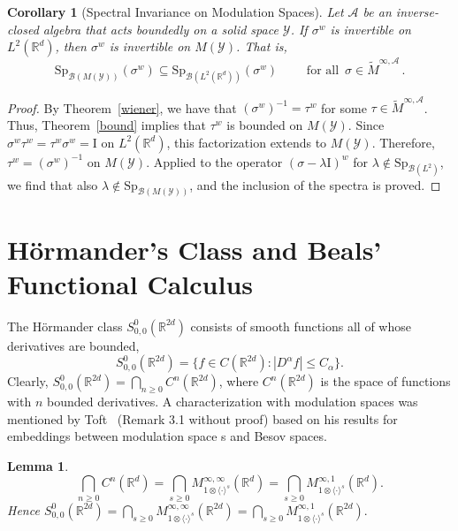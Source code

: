 \documentclass[12pt]{amsart}
\newtheorem{lemma}{Lemma}[section]
\newtheorem{corollary}{Corollary}[section]
\theoremstyle{definition}
\theoremstyle{remark}
\numberwithin{equation}{section}
\newcommand{\modsp}{modulation space}
\newcommand{\rem}{\noindent\textsl{REMARK:}}
\def\cB{\mathcal{B}}
\def\cY{\mathcal{Y}}
\def\bR{{\mathbb{R}}}
\def\weyl{\sigma^w}
\def\rd{\bR^d}
\def\rdd{{\bR^{2d}}}
\def\lrd{L^2(\rd)}
\def\inv{^{-1}}
\def\cB{\mathcal{B}}
\newcommand{\Cal}{\mathcal}
\newcommand{\lan}{\langle}
\newcommand{\ran}{\rangle}
\newcommand{\ac}{\Cal A}
\newcommand{\moda}{\widetilde M^{\infty,\ac}}
\begin{document}
\begin{corollary}
[Spectral Invariance on Modulation Spaces] Let $\ac$ be an
inverse-closed algebra that acts boundedly on a solid space $\cY$.
If $\sigma ^w$ is invertible  on $\lrd $, then $\sigma ^w$ is
invertible on $M(\cY)$. That is,
\begin{equation}
  \label{eq:hh1}
   \mathrm{Sp}_{\cB(M(\cY))} (\weyl) \subseteq  \mathrm{Sp}_{\cB (\lrd)}
 (\weyl) \qquad \text{ for all } \, \sigma \in \moda \, .
\end{equation}
\end{corollary}

\begin{proof}
By Theorem~\ref{wiener}, we have that $(\weyl )\inv = \tau ^w$ for
some $\tau \in \moda$. Thus, Theorem~\ref{bound} implies 
that $\tau ^w$ is bounded on $M(\cY)$. Since $\weyl \tau ^w = \tau
^w
\weyl = \mathrm{I}$ on $\lrd$, this factorization extends to
$M(\cY)$. Therefore, $\tau ^w = (\weyl )\inv $ on $M(\cY)$.
Applied to the
operator $(\sigma -\lambda \mathrm{I})^w$ for $\lambda \not \in
\textrm{Sp}_{\cB (L^2)}$, we find that also $\lambda \not \in
\textrm{Sp}_{\cB (M(\cY))}$, and the inclusion of the spectra is
proved.
\end{proof}





\section{H\"ormander's Class and Beals' Functional Calculus}

The H\"ormander class $S_{0,0}^0(\rdd)$ consists of smooth
functions all of whose  derivatives are bounded,
\[
S_{0,0}^0(\rdd)=\{f\in C(\rdd):|D^\alpha f|\le C_{\alpha}\}.
\]
Clearly,  $S_{0,0}^0(\rdd)=\bigcap_{n\ge0}C^n(\rdd)$,
where $C^n(\rdd)$ is the space of functions with $n$ bounded
derivatives. A characterization with \modsp s was mentioned  by
Toft~\cite{toft07} (Remark 3.1 without proof) based on his results for  embeddings
between \modsp
s and Besov spaces. %
\begin{lemma}\label{horclas}
\begin{equation}
\bigcap _{n\geq 0} C^n (\rd
)=\bigcap_{s\ge0}M^{\infty,\infty}_{1\otimes\lan\cdot\ran^s}(\rd)=\bigcap_{s\ge0}M^{\infty,1}_{1\otimes\lan\cdot\ran^s}(\rd).
\end{equation}
Hence $S_{0,0}^0(\rdd) =
\bigcap_{s\ge0}M^{\infty,\infty}_{1\otimes\lan\cdot\ran^s}(\rdd)=\bigcap_{s\ge0}M^{\infty,1}_{1\otimes\lan\cdot\ran^s}(\rdd).$
\end{lemma}
\end{document}
